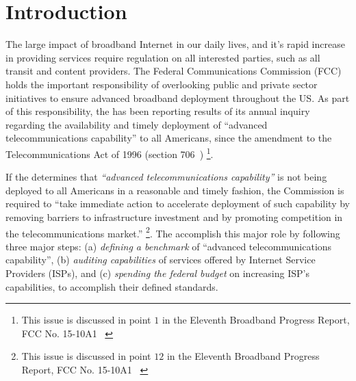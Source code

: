 \section{Introduction}
\label{sec:intro}



The large impact of broadband Internet in our daily lives, and it’s rapid increase in providing
services require regulation on all interested parties, such as all transit and content providers.
The Federal Communications Commission (FCC) holds the important responsibility of overlooking public
and private sector initiatives to ensure advanced broadband deployment throughout the US. As part of
this responsibility, the \FCC has been reporting results of its annual inquiry regarding the
availability and timely deployment of ``advanced telecommunications capability'' to all Americans,
since the amendment to the Telecommunications Act of 1996 (section 706~\cite{fcc1996telecom-act})
\footnote{This issue is discussed in point $1$ in the Eleventh Broadband Progress Report, FCC No. 15-10A1  ~\cite{fcc2015progress-report}}.


If the \FCC determines that \emph{``advanced telecommunications capability''} is not being deployed
to all Americans in a reasonable and timely fashion, the Commission is required to ``take immediate
action to accelerate deployment of such capability by removing barriers to infrastructure investment
and by promoting competition in the telecommunications market.'' \footnote{This issue is discussed
in point $12$ in the Eleventh Broadband Progress Report, FCC No. 15-10A1 ~\cite{fcc2015progress-report}}.
The \FCC accomplish this major role by following three major steps:
(a) \emph{defining a benchmark} of ``advanced telecommunications capability'', (b) \emph{auditing
capabilities} of services offered by Internet Service Providers (ISPs), and (c) \emph{spending the
federal budget} on increasing ISP’s capabilities, to accomplish their defined standards.

